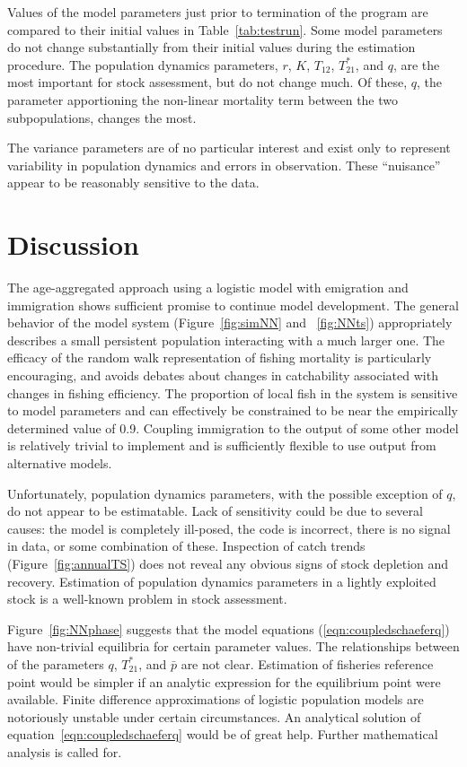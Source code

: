 \documentclass[12pt,letterpaper,twoside]{article}
\begin{document}
Values of the model parameters just prior to termination of the
program are compared to their initial values in
Table~\ref{tab:testrun}.
Some model parameters do not change substantially from their initial
values during the estimation procedure.
The population dynamics parameters, 
$r$, $K$, $T_{12}$, $T^*_{21}$, and $q$, are the most important for 
stock assessment, but do not change much.
Of these, $q$, the parameter apportioning 
the non-linear mortality term between the two subpopulations,
changes the most.

The variance parameters are of no particular interest and exist only
to represent variability in population dynamics and errors in
observation. These ``nuisance'' appear to be reasonably sensitive to the
data.

\section{Discussion}

The age-aggregated approach using a logistic model with emigration and
immigration shows sufficient promise to continue model development.
The general behavior of the model system (Figure~\ref{fig:simNN} and
~\ref{fig:NNts}) appropriately describes a small persistent population
interacting with a much larger one.
The efficacy of the random walk
representation of fishing mortality is particularly encouraging, and
avoids debates about changes in catchability associated with
changes in fishing efficiency.
The proportion of local fish in the system is sensitive to model
parameters and can effectively be constrained to be near the empirically
determined value of 0.9. Coupling immigration to the output of
some other model is relatively trivial to implement and is
sufficiently flexible to use output from alternative models.

Unfortunately, population dynamics parameters, with the possible
exception of $q$, do not appear to be estimatable. Lack of
sensitivity could be due to several causes: the model is completely
ill-posed, the code is incorrect, there is no signal in data, or some
combination of these. Inspection of catch trends
(Figure~\ref{fig:annualTS}) does not reveal any obvious signs of stock
depletion and recovery. Estimation of population dynamics parameters
in a lightly exploited stock is a well-known problem in stock
assessment.

Figure~\ref{fig:NNphase} suggests that the model equations
(\ref{eqn:coupledschaeferq}) have non-trivial equilibria for certain
parameter values.
The relationships between of the parameters $q$, $T^*_{21}$,
and $\bar{p}$ are not clear.
Estimation of fisheries reference point would be simpler if
an analytic expression for the equilibrium point were available.
Finite difference approximations of logistic population models are
notoriously unstable under certain circumstances. An analytical
solution of equation~\ref{eqn:coupledschaeferq} would be of great
help.
Further mathematical analysis is called for.
\end{document}
